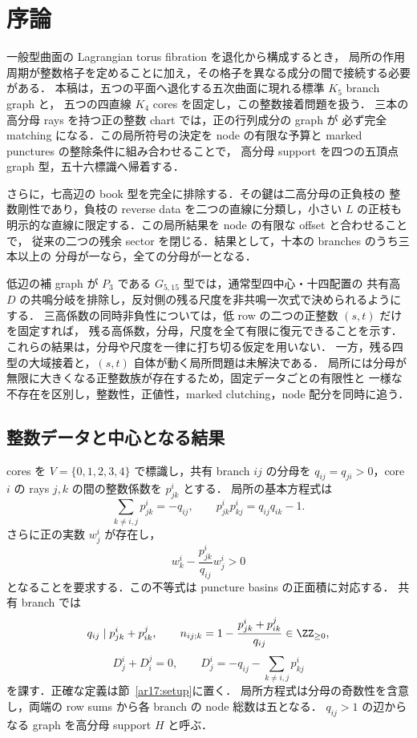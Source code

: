 \section{序論}
\label{ar17:introduction}

一般型曲面の Lagrangian torus fibration を退化から構成するとき，
局所の作用周期が整数格子を定めることに加え，その格子を異なる成分の間で接続する必要がある．
本稿は，五つの平面へ退化する五次曲面に現れる標準 $K_5$ branch graph と，
五つの四直線 $K_4$ cores を固定し，この整数接着問題を扱う．
三本の高分母 rays を持つ正の整数 chart では，正の行列成分の graph が
必ず完全 matching になる．この局所符号の決定を node の有限な予算と
marked punctures の整除条件に組み合わせることで，
高分母 support を四つの五頂点 graph 型，五十六標識へ帰着する．

さらに，七高辺の book 型を完全に排除する．その鍵は二高分母の正負枝の
整数剛性であり，負枝の reverse data を二つの直線に分類し，小さい $L$ の正枝も
明示的な直線に限定する．この局所結果を node の有限な offset と合わせることで，
従来の二つの残余 sector を閉じる．結果として，十本の branches のうち三本以上の
分母が一なら，全ての分母が一となる．

低辺の補 graph が $P_3$ である $G_{5,15}$ 型では，通常型四中心・十四配置の
共有高 $D$ の共鳴分岐を排除し，反対側の残る尺度を非共鳴一次式で決められるようにする．
三高係数の同時非負性については，低 row の二つの正整数 $(s,t)$ だけを固定すれば，
残る高係数，分母，尺度を全て有限に復元できることを示す．
これらの結果は，分母や尺度を一律に打ち切る仮定を用いない．
一方，残る四型の大域接着と，$(s,t)$ 自体が動く局所問題は未解決である．
局所には分母が無限に大きくなる正整数族が存在するため，固定データごとの有限性と
一様な不存在を区別し，整数性，正値性，marked clutching，node 配分を同時に追う．

\subsection{整数データと中心となる結果}

cores を $V=\{0,1,2,3,4\}$ で標識し，共有 branch $ij$ の分母を
$q_{ij}=q_{ji}>0$，core $i$ の rays $j,k$ の間の整数係数を $p^i_{jk}$ とする．
局所の基本方程式は
\[
 \sum_{k\ne i,j}p^i_{jk}=-q_{ij},\qquad
 p^i_{jk}p^i_{kj}=q_{ij}q_{ik}-1.
\]
さらに正の実数 $w^i_j$ が存在し，
\[
 w^i_k-\frac{p^i_{jk}}{q_{ij}}w^i_j>0
\]
となることを要求する．この不等式は puncture basins の正面積に対応する．
共有 branch では
\[
 q_{ij}\mid p^i_{jk}+p^j_{ik},\qquad
 n_{ij;k}=1-\frac{p^i_{jk}+p^j_{ik}}{q_{ij}}\in\ZZ_{\ge0},
\]
\[
 D^i_j+D^j_i=0,\qquad
 D^i_j=-q_{ij}-\sum_{k\ne i,j}p^i_{kj}
\]
を課す．正確な定義は節~\ref{ar17:setup}に置く．
局所方程式は分母の奇数性を含意し，両端の row sums から各 branch の node 総数は五となる．
$q_{ij}>1$ の辺からなる graph を高分母 support $H$ と呼ぶ．

